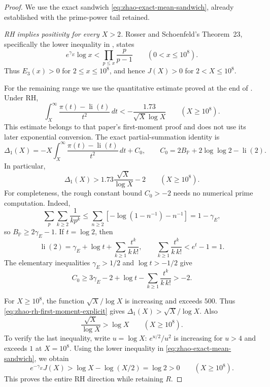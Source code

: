 \documentclass[11pt,a4paper]{article}
\numberwithin{equation}{section}
\theoremstyle{definition}\newtheorem{definition}[theorem]{Definition}
\theoremstyle{remark}\newtheorem{remark}[theorem]{Remark}
\begin{document}
\begin{proof}
We use the exact sandwich
\eqref{eq:zhao-exact-mean-sandwich}, already established with the
prime-power tail retained.

\emph{RH implies positivity for every $X>2$.}
Rosser and Schoenfeld's Theorem~23, specifically the lower inequality in
\cite[Eq.~(4.10), p.~73]{RosserSchoenfeld1962}, states
\[
 e^{\gamma_E}\log x<\prod_{p\leq x}\frac{p}{p-1}
 \qquad(0<x\leq10^8).
\]
Thus $E_3(x)>0$ for $2\leq x\leq10^8$, and hence $J(X)>0$ for
$2<X\leq10^8$.

For the remaining range we use the quantitative estimate proved at the
end of \cite[Section~2, following Eq.~(19)]{Zhao2025}. Under RH,
\begin{equation}
 \label{eq:zhao-rh-imported-tail-bound}
 \int_X^\infty\frac{\pi(t)-\operatorname{li}(t)}{t^2}\,dt
 <-\frac{1.73}{\sqrt X\log X}
 \qquad(X\geq10^8).
\end{equation}
This estimate belongs to that paper's first-moment proof and does not
use its later exponential conversion. The exact partial-summation identity
\cite[Eq.~(18)]{Zhao2025} is
\[
 \Delta_1(X)
 =-X\int_X^\infty\frac{\pi(t)-\operatorname{li}(t)}{t^2}\,dt+C_0,
 \qquad
 C_0=2B_{\mathbb P}+2\log\log2-\operatorname{li}(2).
\]
In particular,
\begin{equation}
 \label{eq:zhao-rh-first-moment-explicit}
 \Delta_1(X)>1.73\frac{\sqrt X}{\log X}-2
 \qquad(X\geq10^8).
\end{equation}
For completeness, the rough constant bound $C_0>-2$ needs no numerical
prime computation. Indeed,
\[
 \sum_p\sum_{k\geq2}\frac1{kp^k}
 \leq\sum_{n\geq2}\left[-\log(1-n^{-1})-n^{-1}\right]
 =1-\gamma_E,
\]
so $B_{\mathbb P}\geq2\gamma_E-1$. If $t=\log2$, then
\[
 \operatorname{li}(2)=\gamma_E+\log t+
       \sum_{k\geq1}\frac{t^k}{k\,k!},
 \qquad
 \sum_{k\geq1}\frac{t^k}{k\,k!}<e^t-1=1.
\]
The elementary inequalities $\gamma_E>1/2$ and $\log t>-1/2$ give
\[
 C_0\geq3\gamma_E-2+\log t-
              \sum_{k\geq1}\frac{t^k}{k\,k!}>-2.
\]

For $X\geq10^8$, the function $\sqrt X/\log X$ is increasing and
exceeds $500$. Thus \eqref{eq:zhao-rh-first-moment-explicit} gives
$\Delta_1(X)>\sqrt X/\log X$. Also
\[
 \frac{\sqrt X}{\log X}>\log X\qquad(X\geq10^8).
\]
To verify the last inequality, write $u=\log X$: $e^{u/2}/u^2$ is
increasing for $u>4$ and exceeds $1$ at $X=10^8$.
Using the lower inequality in \eqref{eq:zhao-exact-mean-sandwich}, we obtain
\[
 e^{-\gamma_E}J(X)
 >\log X-\log(X/2)=\log2>0
 \qquad(X\geq10^8).
\]
This proves the entire RH direction while retaining $R$.


\end{proof}
\end{document}
